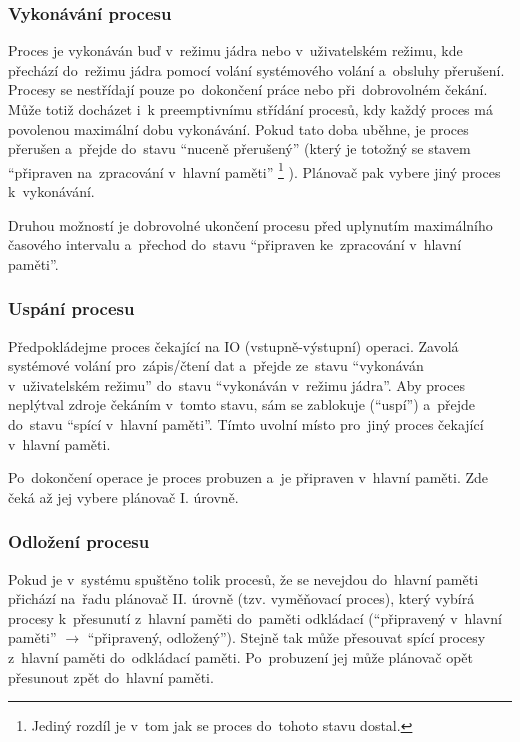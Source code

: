 \subsubsection{Vykonávání procesu}

Proces je vykonáván buď v~režimu jádra nebo v~uživatelském režimu, kde přechází do~režimu jádra pomocí volání systémového volání a~obsluhy přerušení. Procesy se nestřídají pouze po~dokončení práce nebo při~dobrovolném čekání. Může totiž docházet i~k preemptivnímu střídání procesů, kdy každý proces má povolenou maximální dobu vykonávání. Pokud tato doba uběhne, je proces přerušen a~přejde do~stavu \enquote{nuceně přerušený} (který je totožný se stavem \enquote{připraven na~zpracování v~hlavní paměti}%
\footnote{Jediný rozdíl je v~tom jak se proces do~tohoto stavu dostal.}%
). Plánovač pak vybere jiný proces k~vykonávání.

Druhou možností je dobrovolné ukončení procesu před uplynutím maximálního časového intervalu a~přechod do~stavu \enquote{připraven ke~zpracování v~hlavní paměti}.

\subsubsection{Uspání procesu}

Předpokládejme proces čekající na IO (vstupně-výstupní) operaci. Zavolá systémové volání pro~zápis/čtení dat a~přejde ze~stavu \enquote{vykonáván v~uživatelském režimu} do~stavu \enquote{vykonáván v~režimu jádra}. Aby proces neplýtval zdroje čekáním v~tomto stavu, sám se zablokuje (\enquote{uspí}) a~přejde do~stavu \enquote{spící v~hlavní paměti}. Tímto uvolní místo pro~jiný proces čekající v~hlavní paměti.

Po~dokončení operace je proces probuzen a~je připraven v~hlavní paměti. Zde čeká až jej vybere plánovač I. úrovně.

\subsubsection{Odložení procesu}

Pokud je v~systému spuštěno tolik procesů, že se nevejdou do~hlavní paměti přichází na~řadu plánovač II. úrovně (tzv. vyměňovací proces), který vybírá procesy k~přesunutí z~hlavní paměti do~paměti odkládací (\enquote{připravený v~hlavní paměti} $\rightarrow$ \enquote{připravený, odložený}). Stejně tak může přesouvat spící procesy z~hlavní paměti do~odkládací paměti. Po~probuzení jej může plánovač opět přesunout zpět do~hlavní paměti.

